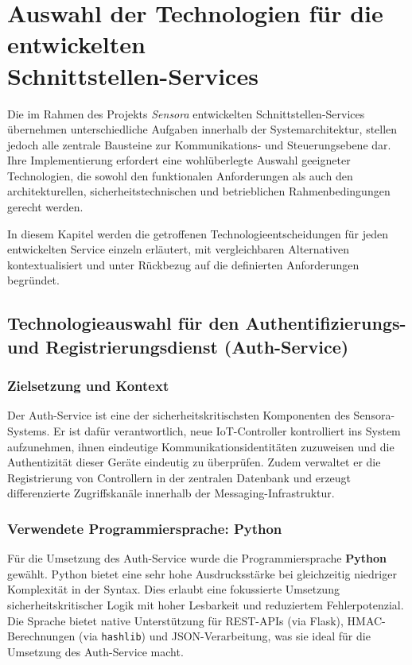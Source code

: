 \section{Auswahl der Technologien f\"ur die entwickelten \\ Schnittstellen-Services}

Die im Rahmen des Projekts \textit{Sensora} entwickelten Schnittstellen-Services \"ubernehmen unterschiedliche Aufgaben innerhalb der Systemarchitektur, stellen jedoch alle zentrale Bausteine zur Kommunikations- und Steuerungsebene dar. Ihre Implementierung erfordert eine wohl\"uberlegte Auswahl geeigneter Technologien, die sowohl den funktionalen Anforderungen als auch den architekturellen, sicherheitstechnischen und betrieblichen Rahmenbedingungen gerecht werden.

In diesem Kapitel werden die getroffenen Technologieentscheidungen f\"ur jeden entwickelten Service einzeln erl\"autert, mit vergleichbaren Alternativen kontextualisiert und unter R\"uckbezug auf die definierten Anforderungen begr\"undet.

\subsection{Technologieauswahl f\"ur den Authentifizierungs- und Registrierungsdienst (Auth-Service)}

\subsubsection*{Zielsetzung und Kontext}

Der Auth-Service ist eine der sicherheitskritischsten Komponenten des Sensora-Systems. Er ist daf\"ur verantwortlich, neue IoT-Controller kontrolliert ins System aufzunehmen, ihnen eindeutige Kommunikationsidentit\"aten zuzuweisen und die Authentizit\"at dieser Ger\"ate eindeutig zu \"uberpr\"ufen. Zudem verwaltet er die Registrierung von Controllern in der zentralen Datenbank und erzeugt differenzierte Zugriffskan\"ale innerhalb der Messaging-Infrastruktur.

\subsubsection*{Verwendete Programmiersprache: Python}

F\"ur die Umsetzung des Auth-Service wurde die Programmiersprache \textbf{Python} gew\"ahlt. Python bietet eine sehr hohe Ausdrucksst\"arke bei gleichzeitig niedriger Komplexit\"at in der Syntax\cite{python_flask_prototyping}. Dies erlaubt eine fokussierte Umsetzung sicherheitskritischer Logik mit hoher Lesbarkeit und reduziertem Fehlerpotenzial. Die Sprache bietet native Unterst\"utzung f\"ur REST-APIs (via Flask), HMAC-Berechnungen (via \texttt{hashlib}) und JSON-Verarbeitung, was sie ideal f\"ur die Umsetzung des Auth-Service macht.

